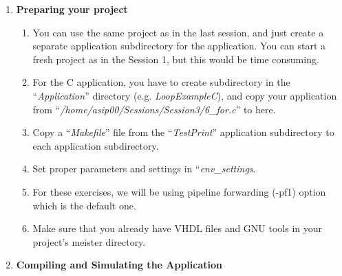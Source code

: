 \documentclass[
]{article}
\begin{document}
\begin{enumerate}
\def\labelenumi{\arabic{enumi}.}
\item
  \textbf{Preparing your project}

  \begin{enumerate}
  \def\labelenumii{\arabic{enumii}.}
  \item
    You can use the same project as in the last session, and just create
    a separate application subdirectory for the application. You can
    start a fresh project as in the Session 1, but this would be time
    consuming.
  \item
    For the C application, you have to create subdirectory in the
    ``\emph{Application}'' directory (e.g. \emph{LoopExampleC}), and
    copy your application from
    ``\emph{/home/asip00/Sessions/Session3/6\_for.c}'' to here.
  \item
    Copy a ``\emph{Makefile}'' file from the ``\emph{TestPrint}''
    application subdirectory to each application subdirectory.
  \item
    Set proper parameters and settings in ``\emph{env\_settings}.
  \item
    For these exercises, we will be using pipeline forwarding (-pf1)
    option which is the default one.
  \item
    Make sure that you already have VHDL files and GNU tools in your
    project's meister directory.
  \end{enumerate}
\item
  \textbf{Compiling and Simulating the Application}


\end{enumerate}
\end{document}
